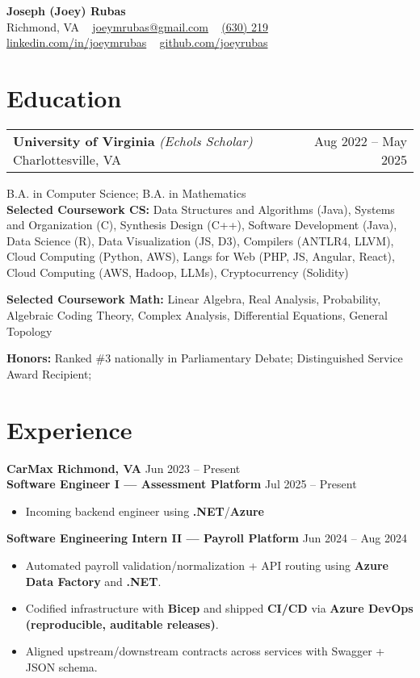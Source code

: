 \documentclass[11pt]{article}
\makeatletter
\newcommand{\NameSize}{18}
\newcommand{\NameLead}{20}
\newcommand{\NameWeight}{\bfseries}
\newcommand{\ContactSize}{10}
\newcommand{\ContactLead}{12}
\newcommand{\ContactSep}{\; \textbar\ \;}  %
\newcommand{\EmployerSize}{11}
\newcommand{\EmployerLead}{13}
\newcommand{\EmployerWeight}{\bfseries}
\newcommand{\EmployerPreSkip}{2pt}
\newcommand{\EmployerPostSkip}{-2pt}
\newcommand{\RoleTitleSize}{11}
\newcommand{\RoleTitleLead}{13}
\newcommand{\RoleTitleWeight}{\bfseries}
\newcommand{\RoleDateSize}{10}
\newcommand{\RoleDateLead}{12}
\newcommand{\RolePreSkip}{2pt}
\newcommand{\RolePostSkip}{-8pt}
\newcommand{\BulletSize}{10}
\newcommand{\BulletLead}{12}
\newenvironment{twocol}[2]{%
  \noindent\begin{tabular*}{\textwidth}{@{\extracolsep{\fill}} l r}
  #1 & #2\\
  \end{tabular*}\ignorespaces
}{\par}
\newcommand{\NameLine}[1]{%
  {\fontsize{\NameSize}{\NameLead}\selectfont \NameWeight #1}%
}
\newcommand{\ContactsLine}[1]{%
  {\fontsize{\ContactSize}{\ContactLead}\selectfont #1}%
}
\newcommand{\EmployerHeader}[2]{%
  \vspace*{\EmployerPreSkip}%
  \noindent
  {\fontsize{\EmployerSize}{\EmployerLead}\selectfont \EmployerWeight #1}%
  \hfill
  {\fontsize{\EmployerSize}{\EmployerLead}\selectfont #2}%
  \\[\EmployerPostSkip]%
}
\newcommand{\RoleHeader}[2]{%
  \vspace*{\RolePreSkip}%
  \noindent
  {\fontsize{\RoleTitleSize}{\RoleTitleLead}\selectfont \RoleTitleWeight #1}%
  \hfill
  {\fontsize{\RoleDateSize}{\RoleDateLead}\selectfont #2}%
  \\[\RolePostSkip]%
}
\newenvironment{ResumeItemize}{%
  \begin{itemize}\fontsize{\BulletSize}{\BulletLead}\selectfont
}{%
  \end{itemize}
}
\makeatother
\begin{document}
\pagestyle{empty}       
\raggedbottom          
\begin{center}
  \NameLine{Joseph (Joey) Rubas}\\[2pt]
  \ContactsLine{%
    Richmond, VA \ContactSep
    \href{mailto:joeymrubas@gmail.com}{joeymrubas@gmail.com} \ContactSep
    \href{tel:+16302199451}{(630) 219\textendash 9451} \ContactSep
    \href{https://www.linkedin.com/in/joeymrubas/}{linkedin.com/in/joeymrubas} \ContactSep
    \href{https://github.com/joeyrubas}{github.com/joeyrubas}%
  }
\end{center}

\section{Education}
\begin{twocol}{\textbf{University of Virginia} \textit{(Echols Scholar)} \quad Charlottesville, VA}{Aug 2022 -- May 2025}\end{twocol}
B.A. in Computer Science; B.A. in Mathematics \\
\textbf{Selected Coursework CS:} Data Structures and Algorithms (Java), Systems and Organization (C), Synthesis Design (C++), Software Development (Java), Data Science (R), Data Visualization (JS, D3), Compilers (ANTLR4, LLVM), Cloud Computing (Python, AWS), Langs for Web (PHP, JS, Angular, React), Cloud Computing (AWS, Hadoop, LLMs), Cryptocurrency (Solidity) 

\textbf{Selected Coursework Math:} Linear Algebra, Real Analysis, Probability, Algebraic Coding Theory, Complex Analysis, Differential Equations, General Topology

\textbf{Honors:} Ranked \( \# \)3 nationally in Parliamentary Debate; Distinguished Service Award Recipient; 

\section{Experience}

\EmployerHeader{CarMax \quad Richmond, VA}{Jun 2023 -- Present}
\RoleHeader{Software Engineer I — Assessment Platform}{Jul 2025 -- Present}
\begin{ResumeItemize}
  \item Incoming backend engineer using \textbf{.NET}/\textbf{Azure}
\end{ResumeItemize}

\RoleHeader{Software Engineering Intern II — Payroll Platform}{Jun 2024 -- Aug 2024}
\begin{ResumeItemize}
  \item Automated payroll validation/normalization + API routing using \textbf{Azure Data Factory} and \textbf{.NET}.
  \item Codified infrastructure with \textbf{Bicep} and shipped \textbf{CI/CD} via \textbf{Azure DevOps} \textbf{(reproducible, auditable releases)}.
  \item Aligned upstream/downstream contracts across services with Swagger + JSON schema.
\end{ResumeItemize}
\end{document}
